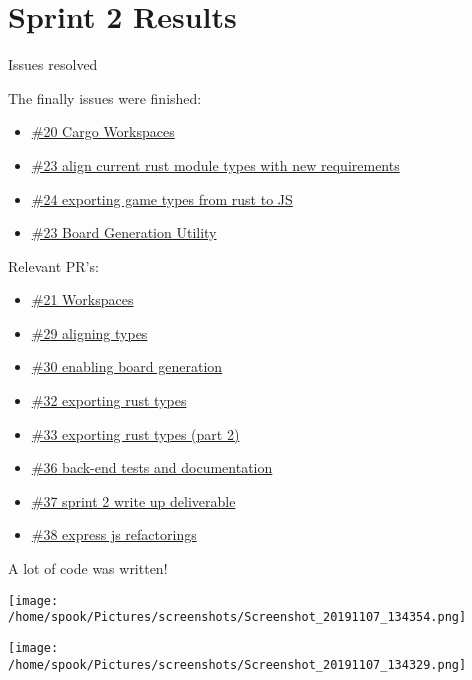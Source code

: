 \documentclass[allowframebreaks]{beamer}
\begin{document}
\section{Sprint 2 Results}
\label{sec:orgb799ad6}
\begin{frame}[allowframebreaks, label=]{Issues resolved}
\begin{block}{The finally issues were finished:}
\begin{itemize}
\item \href{https://github.com/amadeusine/CS449GroupProject/issues/20}{\#20 Cargo Workspaces}
\item \href{https://github.com/amadeusine/CS449GroupProject/issues/23}{\#23 align current rust module types with new requirements}
\item \href{https://github.com/amadeusine/CS449GroupProject/issues/24}{\#24 exporting game types from rust to JS}
\item \href{https://github.com/amadeusine/CS449GroupProject/issues/28}{\#23 Board Generation Utility}
\end{itemize}
\end{block}
\begin{block}{Relevant PR's:}
\begin{itemize}
\item \href{https://github.com/amadeusine/CS449GroupProject/pull/21}{\#21 Workspaces}
\item \href{https://github.com/amadeusine/CS449GroupProject/pull/29}{\#29 aligning types}
\item \href{https://github.com/amadeusine/CS449GroupProject/pull/30}{\#30 enabling board generation}
\item \href{https://github.com/amadeusine/CS449GroupProject/pull/32}{\#32 exporting rust types}
\item \href{https://github.com/amadeusine/CS449GroupProject/pull/33}{\#33 exporting rust types (part 2)}
\item \href{https://github.com/amadeusine/CS449GroupProject/pull/36}{\#36 back-end tests and documentation}
\item \href{https://github.com/amadeusine/CS449GroupProject/pull/37}{\#37 sprint 2 write up deliverable}
\item \href{https://github.com/amadeusine/CS449GroupProject/pull/38}{\#38 express js refactorings}
\end{itemize}
\end{block}
\begin{block}{A lot of code was written!}
\begin{center}
\texttt{[image: /home/spook/Pictures/screenshots/Screenshot\_20191107\_134354.png]}
\end{center}
\framebreak

\begin{center}
\texttt{[image: /home/spook/Pictures/screenshots/Screenshot\_20191107\_134329.png]}
\end{center}
\end{block}
\end{frame}
\end{document}
